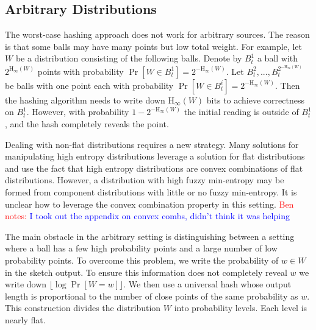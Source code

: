 \documentclass[11pt]{article}
\newcommand{\apref}[1]{\mbox{Appendix~\ref{#1}}}
\newcommand{\Hoo}{\mathrm{H}_\infty}
\newcommand{\authnote}[2]{{\textcolor{red}{\textsf{#1 notes: }\textcolor{blue}{ #2}}\marginpar{\textcolor{red}{\textbf{!!!!!}}}}}
\newcommand{\authnote}[2]{}
\newcommand{\bnote}[1]{{\authnote{Ben}{#1}}}
\begin{document}
\subsection{Arbitrary Distributions}
The worst-case hashing approach does not work for arbitrary sources.  The reason is that some balls may have  many points but low total weight. For example, let $W$ be a distribution consisting of the following balls. Denote by $B^1_t$ a ball with $2^{\Hoo(W)}$ points with probability $\Pr[W\in B^1_t] =2^{-\Hoo(W)}$.  Let $B^2_t,..., B^{2^{-\Hoo(W)}}_t$ be balls with one point each with probability $\Pr[W\in B^i_t] = 2^{-\Hoo(W)}$.  Then the hashing algorithm needs to write down $\Hoo(W)$ bits to achieve correctness on $B^1_t$.  However, with probability $1-2^{-\Hoo(W)}$ the initial reading is outside of $B^1_t$, and the hash completely reveals the point.  

Dealing with non-flat distributions requires a new strategy. 
Many solutions for manipulating high entropy distributions leverage a solution for flat distributions and use the fact that high entropy distributions are convex combinations of flat distributions.  However, a distribution with high fuzzy min-entropy may be formed from component distributions with little or no fuzzy min-entropy.  It is unclear how to leverage the convex combination property in this setting.  \bnote{I took out the appendix on convex combs, didn't think it was helping}%

The main obstacle in the arbitrary setting is distinguishing between a setting where a ball has a few high probability points and a large number of low probability points.
To overcome this problem, we write the probability of $w\in W$ in the sketch output.  To ensure this information does not completely reveal $w$ we write down $\lfloor \log \Pr[W=w] \rfloor$. We then use a universal hash whose output length is proportional to the number of close points of the same probability as $w$.  This construction divides the distribution $W$ into probability levels.  Each level is nearly flat.  
\end{document}
